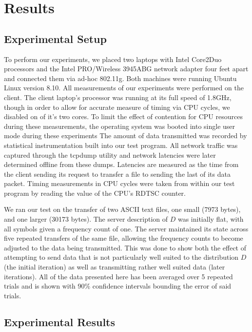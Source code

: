 \documentclass[conference]{IEEEtran}
\begin{document}
\section{Results}

\subsection{Experimental Setup}

To perform our experiments, we placed two laptops with Intel Core2Duo
processors and the Intel PRO/Wireless 3945ABG network adapter four feet
apart and connected them via ad-hoc 802.11g.  Both machines were running 
Ubuntu Linux version 8.10.  All measurements of our
experiments were performed on the client.  The client laptop's processor was
running at its full speed of 1.8GHz, though in order to allow for accurate
measure of timing via CPU cycles, we disabled on of it's two cores.  To 
limit the effect of contention for CPU resources during these measurements,
the operating system was booted into single user mode during these experiments
The amount of data transmitted was recorded by statistical instrumentation built
into our test program.  All network traffic was captured through the
tcpdump utility and network latencies were later determined offline from
these dumps.  Latencies are measured as the time from the client sending its
request to transfer a file to sending the last of its data packet.  
Timing measurements in CPU cycles were taken from within our
test program by reading the value of the CPU's RDTSC counter.

We ran our test on the transfer of two ASCII text files, one small (7973 bytes),
and one larger (30173 bytes).  The server description of $D$ was initially
flat, with all symbols given a frequency count of one.  The server maintained
its state across five repeated transfers of the same file, allowing the 
frequency counts to become adjusted to the data being transmitted.  This was 
done to show both the effect of attempting to send data that is not 
particularly well suited to the distribution $D$ (the initial iteration) as 
well as transmitting rather well suited data (later iterations).  All of 
the data presented here has been averaged over 5 repeated trials and is 
shown with 90\% confidence intervals bounding the error of said trials.

\subsection{Experimental Results}
\end{document}

